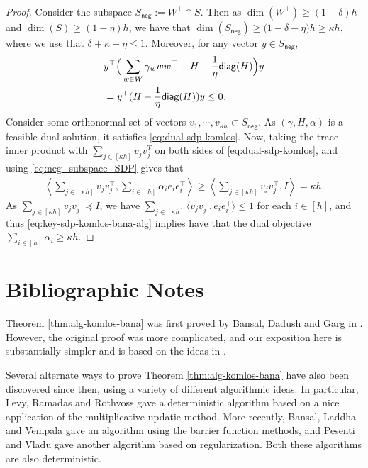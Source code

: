 \begin{proof}
Consider the subspace $S_{\mathsf{neg}} := W^\perp \cap S$. Then
as  $\dim(W^\perp)\geq (1-\delta) h$ and $\dim(S) \geq (1 - \eta) h$, we have that $\dim(S_{\mathsf{neg}}) \geq \big (1 - \delta - \eta  \big) h \geq \kappa h$, where we use that $\delta + \kappa + \eta \leq 1$. Moreover,  
for any vector  $y \in S_{\mathsf{neg}}$, 
\begin{align} \label{eq:neg_subspace_SDP}
& y^\top \Big( \sum_{w \in W} \gamma_w ww^\top + H - \frac{1}{\eta} \mathsf{diag}(H) \Big) y \nonumber \\  
& = y^\top (  H - \frac{1}{\eta} \mathsf{diag}(H) ) y  \leq 0 .
\end{align}
Consider some orthonormal set of vectors $v_1, \cdots, v_{\kappa h} \subset S_{\mathsf{neg}}$.
As $(\gamma,H,\alpha)$ is a feasible dual solution, it satisfies \eqref{eq:dual-sdp-komlos}. Now, taking the trace inner product with  $\sum_{ j \in [\kappa h]} v_jv_j^T$  on both sides of \eqref{eq:dual-sdp-komlos}, and using \eqref{eq:neg_subspace_SDP} gives that 
\begin{align}
\label{eq:key-sdp-komlos-bana-alg}
 \left\langle\sum_{j \in [\kappa h]}  v_j v_j^\top, \sum_{i \in [h]} \alpha_i e_i e_i^\top \right\rangle\geq \left\langle \sum_{j \in [\kappa h]} v_j v_j^\top, I\right\rangle = \kappa h.
\end{align}
As $\sum_{j \in [\kappa h]} v_j v_j^\top \preceq I$, we have $\sum_{j \in [\kappa h]} \langle v_j v_j^\top ,  e_ie_i^\top \rangle \leq 1$ for each $i \in [h]$, and thus \eqref{eq:key-sdp-komlos-bana-alg} implies have that  the dual objective
$\sum_{i \in [h]} \alpha_i  \geq \kappa h$.
\end{proof}

\section{Bibliographic Notes}
Theorem \ref{thm:alg-komlos-bana} was first proved by Bansal, Dadush and Garg in \cite{BDG16}. However, the original proof was more complicated, and our exposition here is substantially simpler and is based on the ideas in \cite{BansalG17}. 

Several alternate ways to prove Theorem \ref{thm:alg-komlos-bana} have also been discovered since then, using a variety of different algorithmic ideas.
In particular, Levy, Ramadas and Rothvoss \cite{LevyRR17} gave a deterministic algorithm based on a nice application of the multiplicative updatie method. More recently, Bansal, Laddha and Vempala  \cite{BansalLV22} gave an algorithm using the barrier function methods, and Pesenti and Vladu \cite{PesentiV23} gave another algorithm based on regularization. Both these algorithms are also deterministic. 